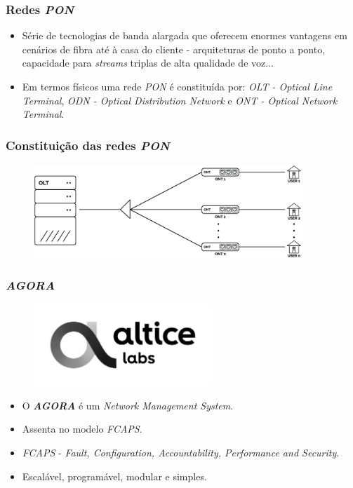 \begin{frame}
    \frametitle{Redes \textit{PON}}
    \begin{itemize}
        \item Série de tecnologias de banda alargada que oferecem enormes
        vantagens em cenários de fibra até à casa do cliente - arquiteturas de
        ponto a ponto, capacidade para \textit{streams} triplas de alta
        qualidade de voz...
        \item Em termos físicos uma rede \textit{PON} é constituída por:
        \textit{OLT - Optical Line Terminal}, \textit{ODN - Optical Distribution
        Network} e \textit{ONT - Optical Network Terminal}.
    \end{itemize}
\end{frame}

\begin{frame}
    \frametitle{Constituição das redes \textit{PON}}
    \centering
    \begin{figure}
        \includegraphics[width=0.9\textwidth]{./assets/estado_de_arte/rede_pon.png}
    \end{figure}    
\end{frame}    

\begin{frame}
    \frametitle{\textit{\textbf{AGORA}}}
    \begin{figure}
        \includegraphics[width=0.6\textwidth]{./assets/estado_de_arte/alticelabs_logo.png}
    \end{figure}    
    \begin{itemize}
        \item O \textit{\textbf{AGORA}} é um \textit{Network Management System}.
        \item Assenta no modelo \textit{FCAPS}.
        \item \textit{FCAPS} - \textit{Fault, Configuration, Accountability,
        Performance and Security}.
        \item Escalável, programável, modular e simples.
    \end{itemize}    
\end{frame}    

